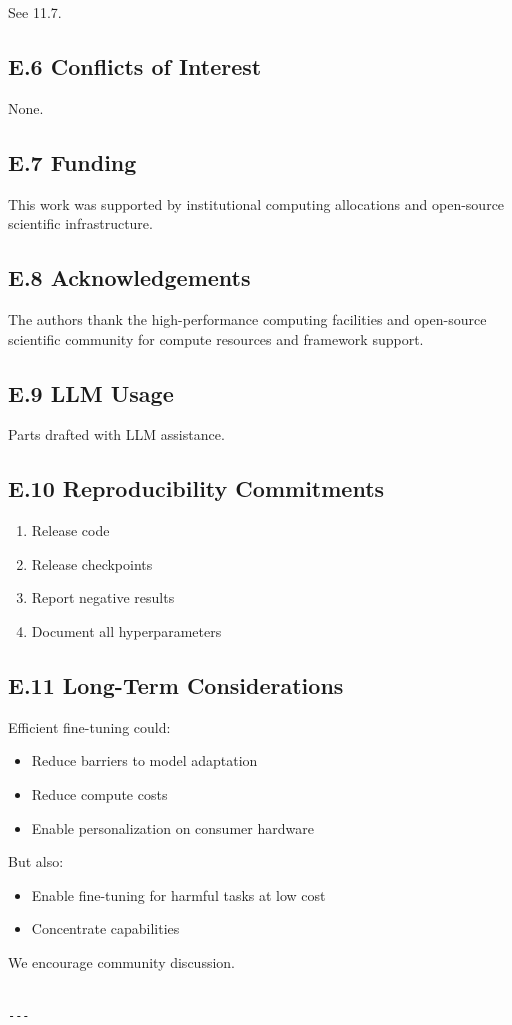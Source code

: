 See  11.7.

\subsection{E.6 Conflicts of Interest}

None.

\subsection{E.7 Funding}

This work was supported by institutional computing allocations and open-source scientific infrastructure.

\subsection{E.8 Acknowledgements}

The authors thank the high-performance computing facilities and open-source scientific community for compute resources and framework support.

\subsection{E.9 LLM Usage}

Parts drafted with LLM assistance.

\subsection{E.10 Reproducibility Commitments}

\begin{enumerate}
\item Release code
\item Release checkpoints
\item Report negative results
\item Document all hyperparameters

\end{enumerate}
\subsection{E.11 Long-Term Considerations}

Efficient fine-tuning could:

\begin{itemize}
\item Reduce barriers to model adaptation
\item Reduce compute costs
\item Enable personalization on consumer hardware

\end{itemize}
But also:

\begin{itemize}
\item Enable fine-tuning for harmful tasks at low cost
\item Concentrate capabilities

\end{itemize}
We encourage community discussion.
\begin{lstlisting}

---
\end{lstlisting}